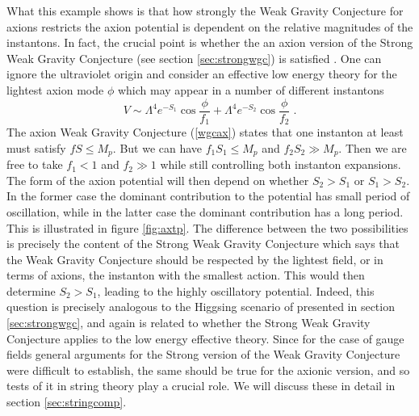 \documentclass[11pt,a4paper]{article}
\numberwithin{equation}{section}
\numberwithin{table}{section}\setlength{\multlinegap}{25pt}
\newcommand{\be}{\begin{equation}}
\newcommand{\ee}{\end{equation}}
\begin{document}
What this example shows is that how strongly the Weak Gravity Conjecture for axions restricts the axion potential is dependent on the relative magnitudes of the instantons. In fact, the crucial point is whether the an axion version of the Strong Weak Gravity Conjecture (see section \ref{sec:strongwgc}) is satisfied \cite{Rudelius:2015xta,Montero:2015ofa,Brown:2015iha,Heidenreich:2015wga,Hebecker:2015rya,Brown:2015lia}. One can ignore the ultraviolet origin and consider an effective low energy theory for the lightest axion mode $\phi$ which may appear in a number of different instantons
\be
\label{2axact}
V \sim  \Lambda^4 e^{-S_1} \cos \frac{\phi}{f_1} +  \Lambda^4 e^{-S_2} \cos \frac{\phi}{f_2} \;.
\ee
The axion Weak Gravity Conjecture (\ref{wgcax}) states that one instanton at least must satisfy $f S \leq M_p$. But we can have $f_1 S_1 \leq M_p$ and $f_2 S_2 \gg M_p$. Then we are free to take $f_1 < 1$ and $f_2 \gg 1$ while still controlling both instanton expansions. The form of the axion potential will then depend on whether $S_2 > S_1$ or $S_1 > S_2$. In the former case the dominant contribution to the potential has small period of oscillation, while in the latter case the dominant contribution has a long period. This is illustrated in figure \ref{fig:axtp}. The difference between the two possibilities is precisely the content of the Strong Weak Gravity Conjecture which says that the Weak Gravity Conjecture should be respected by the lightest field, or in terms of axions, the instanton with the smallest action. This would then determine $S_2 > S_1$, leading to the highly oscillatory potential. Indeed, this question is precisely analogous to the Higgsing scenario of \cite{Saraswat:2016eaz} presented in section \ref{sec:strongwgc}, and again is related to whether the Strong Weak Gravity Conjecture applies to the low energy effective theory. Since for the case of gauge fields general arguments for the Strong version of the Weak Gravity Conjecture were difficult to establish, the same should be true for the axionic version, and so tests of it in string theory play a crucial role. We will discuss these in detail in section \ref{sec:stringcomp}. 
\end{document}
